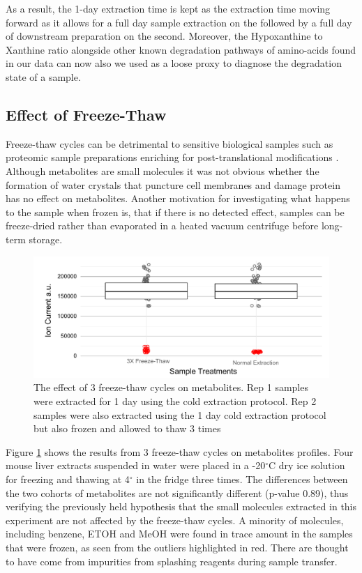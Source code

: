 \documentclass[a4paper,11pt,twoside]{book}
\begin{document}
	As a result, the 1-day extraction time is kept as the extraction time moving forward as it allows for a full day sample extraction on the followed by a full day of downstream preparation on the second. Moreover, the Hypoxanthine to Xanthine ratio alongside other known degradation pathways of amino-acids \citep{Anton2015PreAnalytical} found in our data can now also we used as a loose proxy to diagnose the degradation state of a sample.
	
	\subsection*{Effect of Freeze-Thaw}
	
    Freeze-thaw cycles can be detrimental to sensitive biological samples such as proteomic sample preparations enriching for post-translational modifications \citep{Paltiel2008}. Although metabolites are small molecules it was not obvious whether the formation of water crystals that puncture cell membranes and damage protein has no effect on metabolites. Another motivation for investigating what happens to the sample when frozen is, that if there is no detected effect, samples can be freeze-dried rather than evaporated in a heated vacuum centrifuge before long-term storage.
	
\begin{figure}[th]
	\centering
	\includegraphics[width=1.2\linewidth]{2.Optimizaiton_Figures/Freeze_Thaw}
	\caption{The effect of 3 freeze-thaw cycles on metabolites. Rep 1 samples were extracted for 1 day using the cold extraction protocol. Rep 2 samples were also extracted using the 1 day cold extraction protocol but also frozen and allowed to thaw 3 times}
	\label{Boxplots: Effects of Freeze Thaw Cycle}
\end{figure}
	
    Figure \ref{Boxplots: Effects of Freeze Thaw Cycle} shows the results from 3 freeze-thaw cycles on metabolites profiles. Four mouse liver extracts suspended in water were placed in a -20$^\circ$C dry ice  solution for freezing and thawing at 4$^\circ$ in the fridge three times. The differences between the two cohorts of metabolites are not significantly different (p-value 0.89), thus verifying the previously held hypothesis that the small molecules extracted in this experiment are not affected by the freeze-thaw cycles. A minority of molecules, including benzene, ETOH and MeOH were found in trace amount in the samples that were frozen, as seen from the outliers highlighted in red. There are thought to have come from impurities from splashing reagents during sample transfer.
	
\end{document}
